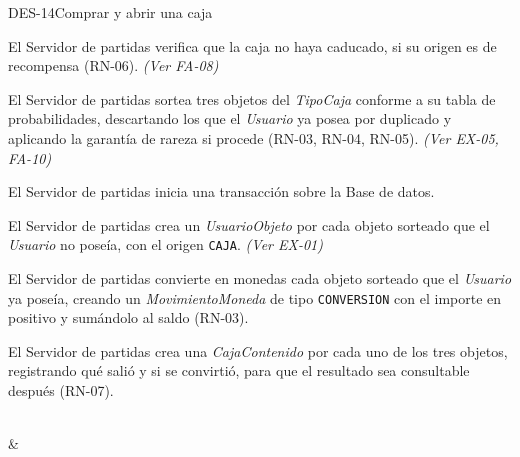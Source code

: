 \begin{fichacu}{DES-14}{Comprar y abrir una caja}
{\begin{cuenum}[start=17]
      \item El Servidor de partidas verifica que la caja no haya caducado, si su origen es de recompensa (\mbox{RN-06}). \textit{(Ver \mbox{FA-08})}
      \item El Servidor de partidas sortea tres objetos del \textit{TipoCaja} conforme a su tabla de probabilidades, descartando los que el \textit{Usuario} ya posea por duplicado y aplicando la garantía de rareza si procede (\mbox{RN-03}, \mbox{RN-04}, \mbox{RN-05}). \textit{(Ver \mbox{EX-05}, \mbox{FA-10})}
      \item El Servidor de partidas inicia una transacción sobre la Base de datos.
      \item El Servidor de partidas crea un \textit{UsuarioObjeto} por cada objeto sorteado que el \textit{Usuario} no poseía, con el origen \texttt{CAJA}. \textit{(Ver \mbox{EX-01})}
      \item El Servidor de partidas convierte en monedas cada objeto sorteado que el \textit{Usuario} ya poseía, creando un \textit{MovimientoMoneda} de tipo \texttt{CONVERSION} con el importe en positivo y sumándolo al saldo (\mbox{RN-03}).
      \item El Servidor de partidas crea una \textit{CajaContenido} por cada uno de los tres objetos, registrando qué salió y si se convirtió, para que el resultado sea consultable después (\mbox{RN-07}).
    \end{cuenum}} \\
   & 
\end{fichacu}
